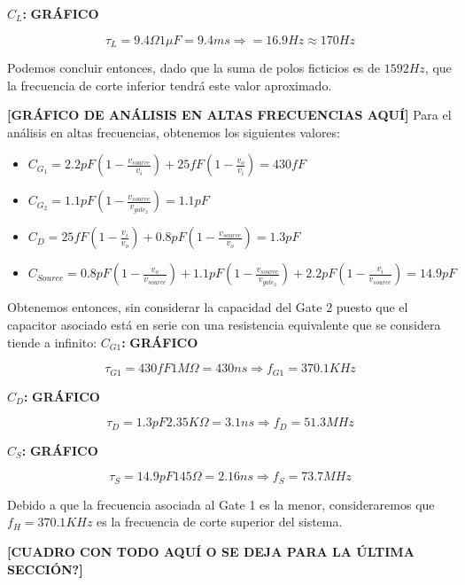 \documentclass[a4paper, 10pt, spanish]{article}
\begin{document}
\textbf{$C_L$:}
\textbf{GRÁFICO}

\begin{equation}
  \tau_L = 9.4\Omega 1\mu F = 9.4ms \Rightarrow = 16.9 Hz \approx 170 Hz
\end{equation}

Podemos concluir entonces, dado que la suma de polos ficticios es de $1592Hz$, que la frecuencia de corte inferior tendrá este valor aproximado.

\textbf{[GRÁFICO DE ANÁLISIS EN ALTAS FRECUENCIAS AQUÍ]}
Para el análisis en altas frecuencias, obtenemos los siguientes valores:

\begin{itemize}
  \item $C_{G_1}=2.2pF(1-\frac{v_{source}}{v_i})+25fF(1-\frac{v_o}{v_i}) = 430fF$
  \item $C_{G_2}=1.1pF(1-\frac{v_{source}}{v_{gate_2}}) = 1.1pF$
  \item $C_{D}=25fF(1-\frac{v_i}{v_o})+0.8pF(1-\frac{v_{source}}{v_o}) = 1.3pF$
  \item $C_{Source}=0.8pF(1-\frac{v_o}{v_{source}})+1.1pF(1-\frac{v_{source}}{v_{gate_2}})+2.2pF(1-\frac{v_i}{v_{source}}) = 14.9pF$
\end{itemize}

Obtenemos entonces, sin considerar la capacidad del Gate 2 puesto que el capacitor asociado está en serie con una resistencia equivalente que se considera tiende a infinito:
\textbf{$C_{G1}$:}
\textbf{GRÁFICO}

\begin{equation}
  \tau_{G1} = 430fF 1M\Omega = 430ns \Rightarrow f_{G1} = 370.1 KHz
\end{equation}


\textbf{$C_{D}$:}
\textbf{GRÁFICO}

\begin{equation}
  \tau_{D} = 1.3pF 2.35K\Omega = 3.1ns \Rightarrow f_{D} = 51.3 MHz
\end{equation}

\textbf{$C_{S}$:}
\textbf{GRÁFICO}

\begin{equation}
  \tau_{S} = 14.9 pF 145\Omega = 2.16ns \Rightarrow f_{S} = 73.7 MHz
\end{equation}

Debido a que la frecuencia asociada al Gate 1 es la menor, consideraremos que $f_H=370.1KHz$ es la frecuencia de corte superior del sistema.

\textbf{[CUADRO CON TODO AQUÍ O SE DEJA PARA LA ÚLTIMA SECCIÓN?]}
\end{document}
